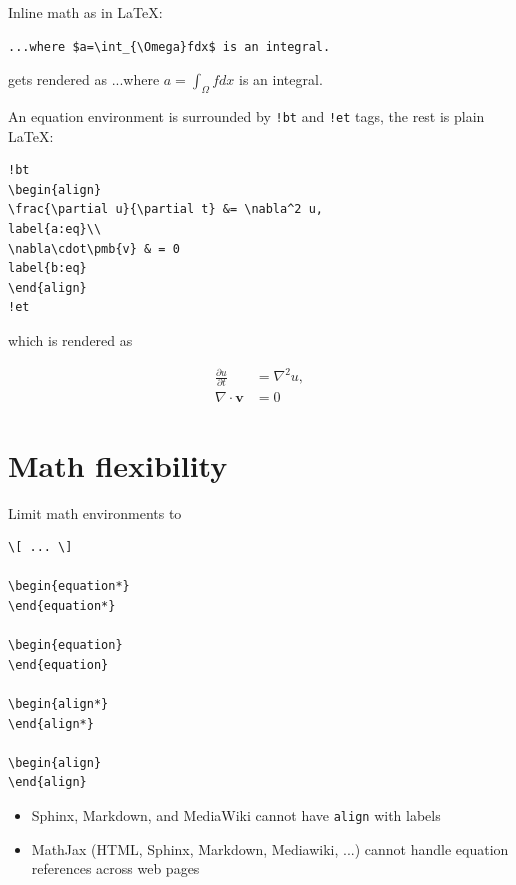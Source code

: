 \documentclass[%
twoside,                 %
final,                   %
chapterprefix=true,      %
open=right               %
10pt]{book}
\newenvironment{graybox1admon}[1][]{
\begin{graybox1mdframed}[frametitle=#1]
}
{
\end{graybox1mdframed}
}
\begin{document}
Inline math as in {\LaTeX}:

\begin{Verbatim}[numbers=none,fontsize=\fontsize{9pt}{9pt},baselinestretch=0.95]
...where $a=\int_{\Omega}fdx$ is an integral.
\end{Verbatim}
gets rendered as ...where $a=\int_{\Omega}fdx$ is an integral.


An equation environment is surrounded by \Verb~!bt~ and \Verb~!et~ tags,
the rest is plain {\LaTeX}:

\begin{Verbatim}[numbers=none,fontsize=\fontsize{9pt}{9pt},baselinestretch=0.95]
!bt
\begin{align}
\frac{\partial u}{\partial t} &= \nabla^2 u,
label{a:eq}\\ 
\nabla\cdot\pmb{v} & = 0
label{b:eq}
\end{align}
!et
\end{Verbatim}
which is rendered as

\begin{align}
\frac{\partial u}{\partial t} &= \nabla^2 u,
\label{a:eq}\\ 
\nabla\cdot\pmb{v} & = 0
\label{b:eq}
\end{align}

\section*{Math flexibility}

Limit math environments to

\begin{Verbatim}[numbers=none,fontsize=\fontsize{9pt}{9pt},baselinestretch=0.95]
\[ ... \]

\begin{equation*}
\end{equation*}

\begin{equation}
\end{equation}

\begin{align*}
\end{align*}

\begin{align}
\end{align}
\end{Verbatim}


\begin{graybox1admon}[Doconce fix of shortcomings.]
\begin{itemize}
 \item Sphinx, Markdown, and MediaWiki cannot have
   \Verb!align! with labels

 \item MathJax (HTML, Sphinx, Markdown, Mediawiki, ...) cannot
   handle equation references across web pages
\end{itemize}

\noindent
\end{graybox1admon}
\end{document}
